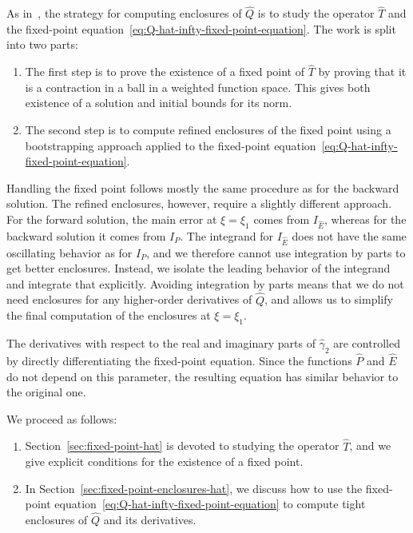 \documentclass[11pt]{article}
\begin{document}
As in~\cite{Dahne2024}, the strategy for computing enclosures of
\(\hat{Q}\) is to study the operator \(\hat{T}\) and the fixed-point
equation~\eqref{eq:Q-hat-infty-fixed-point-equation}. The work is
split into two parts:
\begin{enumerate}
\item The first step is to prove the existence of a fixed point of
  \(\hat{T}\) by proving that it is a contraction in a ball in a
  weighted function space. This gives both existence of a solution and
  initial bounds for its norm.
\item The second step is to compute refined enclosures of the fixed
  point using a bootstrapping approach applied to the fixed-point
  equation~\eqref{eq:Q-hat-infty-fixed-point-equation}.
\end{enumerate}
Handling the fixed point follows mostly the same procedure as for the
backward solution. The refined enclosures, however, require a slightly
different approach. For the forward solution, the main error at
\(\xi = \xi_{1}\) comes from \(I_{\hat{E}}\), whereas for the backward
solution it comes from \(I_{P}\). The integrand for \(I_{\hat{E}}\)
does not have the same oscillating behavior as for \(I_{P}\), and we
therefore cannot use integration by parts to get better enclosures.
Instead, we isolate the leading behavior of the integrand and
integrate that explicitly. Avoiding integration by parts means that we
do not need enclosures for any higher-order derivatives of
\(\hat{Q}\), and allows us to simplify the final computation of the
enclosures at \(\xi = \xi_{1}\).

The derivatives with respect to the real and imaginary parts of
\(\hat{\gamma}_{2}\) are controlled by directly differentiating the
fixed-point equation. Since the functions \(\hat{P}\) and \(\hat{E}\)
do not depend on this parameter, the resulting equation has similar
behavior to the original one.

We proceed as follows:
\begin{enumerate}
\item Section~\ref{sec:fixed-point-hat} is devoted to studying the
  operator \(\hat{T}\), and we give explicit conditions for the
  existence of a fixed point.
\item In Section~\ref{sec:fixed-point-enclosures-hat}, we discuss how
  to use the fixed-point
  equation~\eqref{eq:Q-hat-infty-fixed-point-equation} to compute
  tight enclosures of \(\hat{Q}\) and its derivatives.
\end{enumerate}
\end{document}
